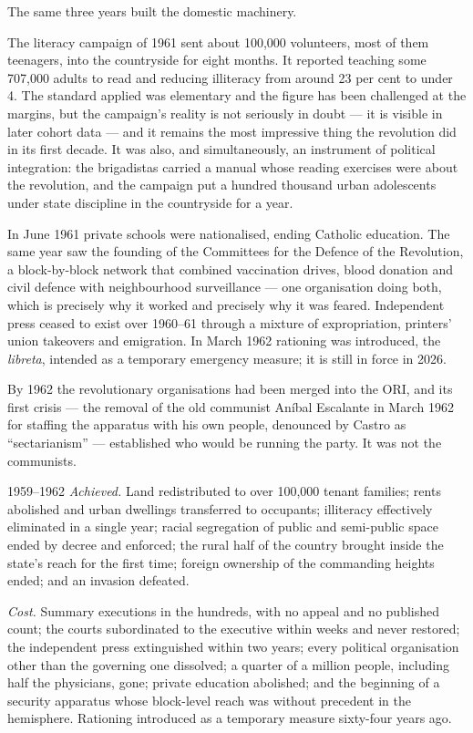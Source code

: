 The same three years built the domestic machinery.

The literacy campaign of 1961 sent about 100,000 volunteers, most of them
teenagers, into the countryside for eight months. It reported teaching some
707,000 adults to read and reducing illiteracy from around 23 per cent to under
4.\unv{} The standard applied was elementary and the figure has been challenged
at the margins, but the campaign's reality is not seriously in doubt --- it is
visible in later cohort data --- and it remains the most impressive thing the
revolution did in its first decade. It was also, and simultaneously, an
instrument of political integration: the brigadistas carried a manual whose
reading exercises were about the revolution, and the campaign put a hundred
thousand urban adolescents under state discipline in the countryside for a
year.

In June 1961 private schools were nationalised, ending Catholic education. The
same year saw the founding of the Committees for the Defence of the Revolution,
a block-by-block network that combined vaccination drives, blood donation and
civil defence with neighbourhood surveillance --- one organisation doing both,
which is precisely why it worked and precisely why it was feared.
Independent press ceased to exist over 1960--61 through a mixture of
expropriation, printers' union takeovers and emigration. In March 1962 rationing
was introduced, the \emph{libreta}, intended as a temporary emergency
measure; it is still in force in 2026.

By 1962 the revolutionary organisations had been merged into the ORI, and its
first crisis --- the removal of the old communist An\'ibal Escalante in March
1962 for staffing the apparatus with his own people, denounced by Castro as
``sectarianism'' --- established who would be running the party. It was not the
communists.

\begin{ledger}{1959--1962}
\emph{Achieved.} Land redistributed to over 100,000 tenant families; rents
abolished and urban dwellings transferred to occupants; illiteracy effectively
eliminated in a single year; racial segregation of public and semi-public space
ended by decree and enforced; the rural half of the country brought inside the
state's reach for the first time; foreign ownership of the commanding heights
ended; and an invasion defeated.

\emph{Cost.} Summary executions in the hundreds, with no appeal and no
published count; the courts subordinated to the executive within weeks and
never restored; the independent press extinguished within two years; every
political organisation other than the governing one dissolved; a quarter of a
million people, including half the physicians, gone; private education
abolished; and the beginning of a security apparatus whose block-level reach
was without precedent in the hemisphere. Rationing introduced as a temporary
measure sixty-four years ago.
\end{ledger}
